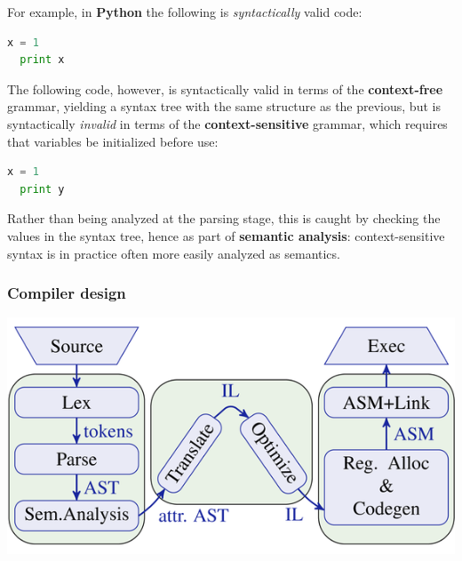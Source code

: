 \documentclass{beamer}
\begin{document}
\begin{frame}[fragile]
  For example, in \textbf{Python} the following is \textit{syntactically} valid
  code:

  \begin{lstlisting}[language=python]
  x = 1
  print x \end{lstlisting}

  The following code, however, is syntactically valid in terms of the
  \textbf{context-free} grammar, yielding a syntax tree with the same structure
  as the previous, but is syntactically \textit{invalid} in terms of the
  \textbf{context-sensitive} grammar, which requires that variables be
  initialized before use:

  \begin{lstlisting}[language=python]
  x = 1
  print y \end{lstlisting}

  Rather than being analyzed at the parsing stage, this is caught by checking
  the values in the syntax tree, hence as part of \textbf{semantic analysis}:
  context-sensitive syntax is in practice often more easily analyzed as
  semantics.
\end{frame}

\begin{frame}
  \frametitle{Compiler design}
  \begin{center}
    \includegraphics[scale=0.5]{compiler}
  \end{center}
\end{frame}
\end{document}
